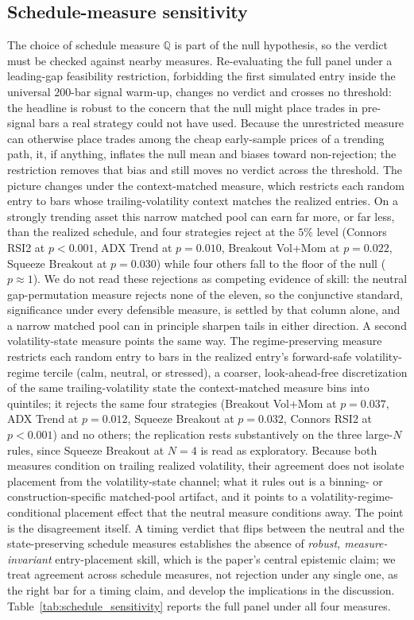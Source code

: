 \documentclass[risks,article,submit,pdftex,oneauthor]{Definitions/mdpi}
\begin{document}
\subsection{Schedule-measure sensitivity}
\label{sec:schedule-sensitivity}

The choice of schedule measure $\mathbb{Q}$ is part of the null hypothesis, so the verdict must be checked against nearby measures. Re-evaluating the full panel under a leading-gap feasibility restriction, forbidding the first simulated entry inside the universal $200$-bar signal warm-up, changes no verdict and crosses no threshold: the headline is robust to the concern that the null might place trades in pre-signal bars a real strategy could not have used. Because the unrestricted measure can otherwise place trades among the cheap early-sample prices of a trending path, it, if anything, inflates the null mean and biases toward non-rejection; the restriction removes that bias and still moves no verdict across the threshold. The picture changes under the context-matched measure, which restricts each random entry to bars whose trailing-volatility context matches the realized entries. On a strongly trending asset this narrow matched pool can earn far more, or far less, than the realized schedule, and four strategies reject at the $5\%$ level (Connors RSI2 at $p<0.001$, ADX Trend at $p=0.010$, Breakout Vol+Mom at $p=0.022$, Squeeze Breakout at $p=0.030$) while four others fall to the floor of the null ($p\approx1$). We do not read these rejections as competing evidence of skill: the neutral gap-permutation measure rejects none of the eleven, so the conjunctive standard, significance under every defensible measure, is settled by that column alone, and a narrow matched pool can in principle sharpen tails in either direction. A second volatility-state measure points the same way. The regime-preserving measure restricts each random entry to bars in the realized entry's forward-safe volatility-regime tercile (calm, neutral, or stressed), a coarser, look-ahead-free discretization of the same trailing-volatility state the context-matched measure bins into quintiles; it rejects the same four strategies (Breakout Vol+Mom at $p=0.037$, ADX Trend at $p=0.012$, Squeeze Breakout at $p=0.032$, Connors RSI2 at $p<0.001$) and no others; the replication rests substantively on the three large-$N$ rules, since Squeeze Breakout at $N=4$ is read as exploratory. Because both measures condition on trailing realized volatility, their agreement does not isolate placement from the volatility-state channel; what it rules out is a binning- or construction-specific matched-pool artifact, and it points to a volatility-regime-conditional placement effect that the neutral measure conditions away. The point is the disagreement itself. A timing verdict that flips between the neutral and the state-preserving schedule measures establishes the absence of \emph{robust, measure-invariant} entry-placement skill, which is the paper's central epistemic claim; we treat agreement across schedule measures, not rejection under any single one, as the right bar for a timing claim, and develop the implications in the discussion. Table~\ref{tab:schedule_sensitivity} reports the full panel under all four measures.
\end{document}
